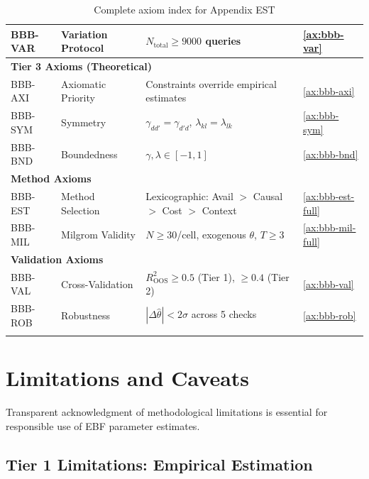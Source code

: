 \documentclass[11pt,a4paper]{article}
\theoremstyle{definition}
\begin{document}
\begin{longtable}{llp{7cm}l}
BBB-VAR & Variation Protocol & $N_{\text{total}} \geq 9000$ queries & \ref{ax:bbb-var} \\
\midrule
\multicolumn{4}{l}{\textbf{Tier 3 Axioms (Theoretical)}} \\
BBB-AXI & Axiomatic Priority & Constraints override empirical estimates & \ref{ax:bbb-axi} \\
BBB-SYM & Symmetry & $\gamma_{dd'} = \gamma_{d'd}$, $\lambda_{kl} = \lambda_{lk}$ & \ref{ax:bbb-sym} \\
BBB-BND & Boundedness & $\gamma, \lambda \in [-1, 1]$ & \ref{ax:bbb-bnd} \\
\midrule
\multicolumn{4}{l}{\textbf{Method Axioms}} \\
BBB-EST & Method Selection & Lexicographic: Avail $>$ Causal $>$ Cost $>$ Context & \ref{ax:bbb-est-full} \\
BBB-MIL & Milgrom Validity & $N \geq 30$/cell, exogenous $\theta$, $T \geq 3$ & \ref{ax:bbb-mil-full} \\
\midrule
\multicolumn{4}{l}{\textbf{Validation Axioms}} \\
BBB-VAL & Cross-Validation & $R^2_{\text{OOS}} \geq 0.5$ (Tier 1), $\geq 0.4$ (Tier 2) & \ref{ax:bbb-val} \\
BBB-ROB & Robustness & $|\Delta\hat{\theta}| < 2\sigma$ across 5 checks & \ref{ax:bbb-rob} \\
\bottomrule
\caption{Complete axiom index for Appendix EST}
\label{tab:bbb-axiom-index}
\end{longtable}





\section{Limitations and Caveats}
\label{sec:bbb-limitations}

Transparent acknowledgment of methodological limitations is essential for 
responsible use of EBF parameter estimates.

\subsection{Tier 1 Limitations: Empirical Estimation}
\end{document}
